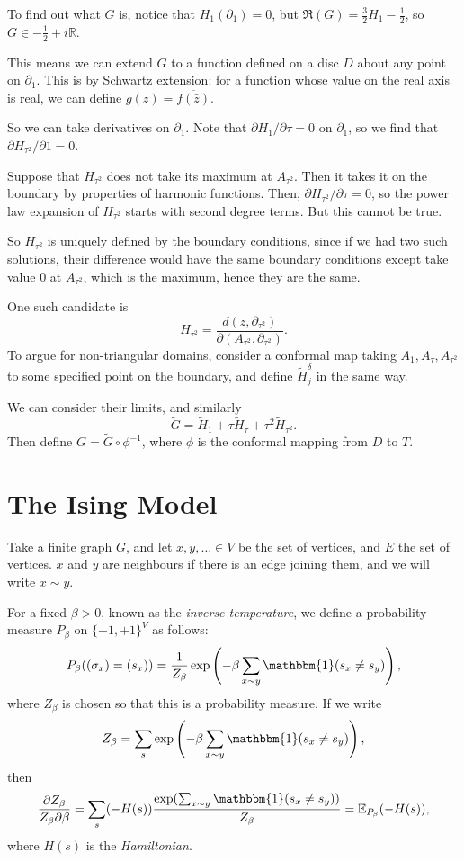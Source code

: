 \documentclass[12pt]{article}
\begin{document}
To find out what $G$ is, notice that $H_1(\partial_1) = 0$, but $\Re(G) = \frac 32 H_1 - \frac 12$, so $G \in - \frac 12 + i \mathbb{R}$.

This means we can extend $G$ to a function defined on a disc $D$ about any point on $\partial_1$. This is by Schwartz extension: for a function whose value on the real axis is real, we can define $g(z) = \overline{f(\bar z)}$.

So we can take derivatives on $\partial_1$. Note that $\partial H_1/\partial \tau = 0$ on $\partial_1$, so we find that $\partial H_{\tau^2}/\partial 1 = 0$.

Suppose that $H_{\tau^2}$ does not take its maximum at $A_{\tau^2}$. Then it takes it on the boundary by properties of harmonic functions. Then, $\partial H_{\tau^2}/\partial \tau = 0$, so the power law expansion of $H_{\tau^2}$ starts with second degree terms. But this cannot be true.

So $H_{\tau^2}$ is uniquely defined by the boundary conditions, since if we had two such solutions, their difference would have the same boundary conditions except take value $0$ at $A_{\tau^2}$, which is the maximum, hence they are the same.

One such candidate is 
\[
H_{\tau^2} = \frac{d(z, \partial_{\tau^2})}{\partial(A_{\tau^2}, \partial_{\tau^2})}.
\]
To argue for non-triangular domains, consider a conformal map taking $A_1, A_\tau, A_{\tau^2}$ to some specified point on the boundary, and define $\tilde H_j^{\delta}$ in the same way.

We can consider their limits, and similarly
\[
\tilde G = \tilde H_1 + \tau \tilde H_\tau + \tau^2 \tilde H_{\tau^2}.
\]
Then define $G = \tilde G \circ \phi^{-1}$, where $\phi$ is the conformal mapping from $D$ to $T$.


\newpage

\section{The Ising Model}%
\label{sec:im}

Take a finite graph $G$, and let $x, y, \ldots \in V$ be the set of vertices, and $E$ the set of vertices. $x$ and $y$ are neighbours if there is an edge joining them, and we will write $x \sim y$.

For a fixed $\beta > 0$, known as the \emph{inverse temperature}, we define a probability measure $P_\beta$ on $\{-1, +1\}^{V}$ as follows:
\[
P_\beta((\sigma_x) = (s_x)) = \frac{1}{Z_\beta} \exp \left( - \beta \sum_{x \sim y} \mathbbm{1}(s_x \neq s_y) \right),
\]
where $Z_\beta$ is chosen so that this is a probability measure. If we write
\[
Z_\beta = \sum_{s} \exp \left( - \beta \sum_{x \sim y} \mathbbm{1}(s_x \neq s_y) \right),
\]
then
\[
\frac{\partial Z_\beta}{Z_\beta \partial \beta} = \sum_s (- H(s)) \frac{\exp(\sum_{x \sim y} \mathbbm{1}(s_x \neq s_y))}{Z_\beta} = \mathbb{E}_{P_\beta}(-H(s)),
\]
where $H(s)$ is the \emph{Hamiltonian}.
\end{document}
